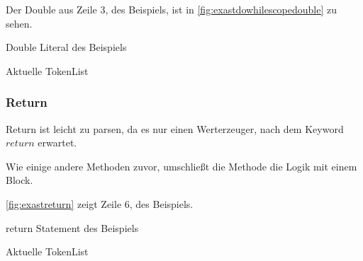       Der Double aus Zeile 3, des Beispiels, ist in \autoref{fig:exastdowhilescopedouble} zu sehen.
      \begin{paracol}{2}
        \begin{myCodeEnv}
          \centering
          \begin{myInvBox}[width=.9\linewidth]
            
          \end{myInvBox}
          \caption{Double Literal des Beispiels}
          \label{fig:exastdowhilescopedouble}
        \end{myCodeEnv}
        \switchcolumn
        \begin{myCodeEnv}
          \centering
          \begin{myInvBox}[width=.9\linewidth]
            
          \end{myInvBox}
          \caption*{Aktuelle TokenList}
        \end{myCodeEnv}
      \end{paracol}

    \subsubsection{Return}
    \label{sssec:Return}
      Return ist leicht zu parsen, da es nur einen Werterzeuger, nach dem Keyword \myRIn$return$ erwartet.

      Wie einige andere Methoden zuvor, umschließt die  Methode die Logik mit einem  Block.

      \autoref{fig:exastreturn} zeigt Zeile 6, des Beispiels.
      \begin{paracol}{2}
        \begin{myCodeEnv}
          \centering
          \begin{myInvBox}[width=.9\linewidth]
            
          \end{myInvBox}
          \caption{return Statement des Beispiels}
          \label{fig:exastreturn}
        \end{myCodeEnv}
        \switchcolumn
        \begin{myCodeEnv}
          \centering
          \begin{myInvBox}[width=.9\linewidth]
            
          \end{myInvBox}
          \caption*{Aktuelle TokenList}
        \end{myCodeEnv}
      \end{paracol}

